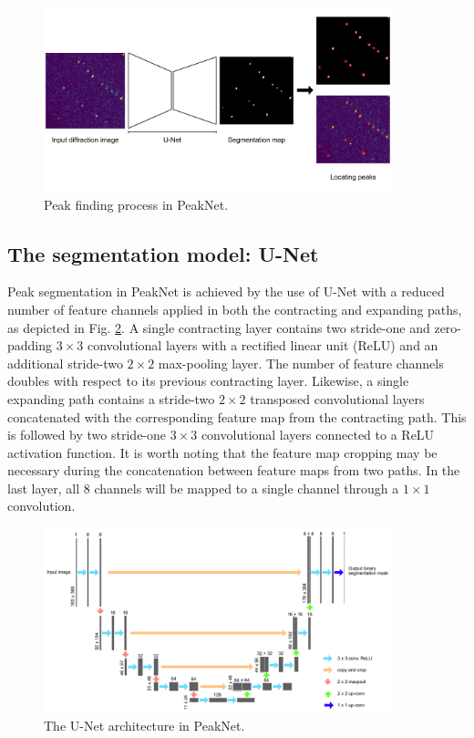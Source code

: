 \documentclass[conference]{IEEEtran}
\newcommand{\peaknet}{PeakNet}
\begin{document}
\begin{figure}[htbp]
\centering
\includegraphics[width=0.9\textwidth,keepaspectratio]
{./figures/peaknet.method.pdf}
\caption{Peak finding process in \peaknet{}.}
\label{fig : peak finding}
\end{figure}


\subsection{The segmentation model: U-Net}

Peak segmentation in \peaknet{} is achieved by the use of U-Net
\citep{ronnebergerUNetConvolutionalNetworks2015} with a reduced number of
feature channels applied in both the contracting and expanding paths, as
depicted in Fig. \ref{fig : unet}.  A single contracting layer contains two
stride-one and zero-padding $3 \times 3$ convolutional layers with a rectified
linear unit (ReLU) \citep{fukushimaCognitronSelforganizingMultilayered1975} and
an additional stride-two $2 \times 2$ max-pooling layer.  The number of feature
channels doubles with respect to its previous contracting layer.  Likewise, a
single expanding path contains a stride-two $2 \times 2$ transposed
convolutional layers concatenated with the corresponding feature map from the
contracting path.  This is followed by two stride-one $3 \times 3$ convolutional
layers connected to a ReLU activation function.  It is worth noting that the
feature map cropping may be necessary during the concatenation between feature
maps from two paths.  In the last layer, all 8 channels will be mapped to a
single channel through a $1 \times 1$ convolution.

\begin{figure}[htbp]    %
\centering
\includegraphics[width=0.9\textwidth,keepaspectratio]
{./figures/unet.pdf}
\caption{The U-Net architecture in \peaknet{}.}
\label{fig : unet}
\end{figure}
\end{document}
